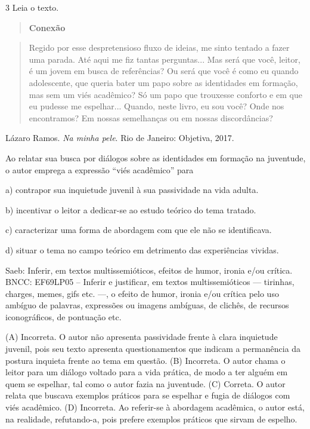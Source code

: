 \num{3} Leia o texto.

\begin{quote}
\textbf{Conexão}
\end{quote}

\begin{quote}
Regido por esse despretensioso fluxo de ideias, me sinto tentado a fazer
uma parada. Até aqui me fiz tantas perguntas... Mas será que você,
leitor, é um jovem em busca de referências? Ou será que você é como eu
quando adolescente, que queria bater um papo sobre as identidades em
formação, mas sem um viés acadêmico? Só um papo que trouxesse conforto e
em que eu pudesse me espelhar... Quando, neste livro, eu sou você? Onde
nos encontramos? Em nossas semelhanças ou em nossas discordâncias?
\end{quote}

Lázaro Ramos. \emph{Na minha pele}. Rio de Janeiro: Objetiva, 2017.

Ao relatar sua busca por diálogos sobre as identidades em formação na
juventude, o autor emprega a expressão ``viés acadêmico'' para

a) contrapor sua inquietude juvenil à sua passividade na vida adulta.

b) incentivar o leitor a dedicar-se ao estudo teórico do tema tratado.

c) caracterizar uma forma de abordagem com que ele não se identificava.

d) situar o tema no campo teórico em detrimento das experiências
vividas.

Saeb: Inferir, em textos multissemióticos, efeitos de humor, ironia e/ou
crítica. BNCC: EF69LP05 -- Inferir e justificar, em textos
multissemióticos --- tirinhas, charges, memes, gifs etc. ---, o efeito
de humor, ironia e/ou crítica pelo uso ambíguo de palavras, expressões
ou imagens ambíguas, de clichês, de recursos iconográficos, de pontuação
etc.

(A) Incorreta. O autor não apresenta passividade frente à clara
inquietude juvenil, pois seu texto apresenta questionamentos que indicam
a permanência da postura inquieta frente ao tema em questão. (B)
Incorreta. O autor chama o leitor para um diálogo voltado para a vida
prática, de modo a ter alguém em quem se espelhar, tal como o autor
fazia na juventude. (C) Correta. O autor relata que buscava exemplos
práticos para se espelhar e fugia de diálogos com viés acadêmico. (D)
Incorreta. Ao referir-se à abordagem acadêmica, o autor está, na
realidade, refutando-a, pois prefere exemplos práticos que sirvam de
espelho.


